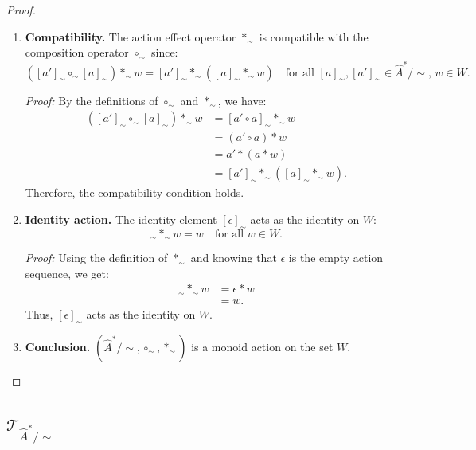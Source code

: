 \begin{proof}
\begin{enumerate}[(1)]
    \item \textbf{Compatibility.}
    The action effect operator $\ast_{\sim}$ is compatible with the composition operator $\circ_{\sim}$ since:
    \begin{equation}
        ([a']_{\sim} \circ_{\sim} [a]_{\sim}) \ast_{\sim} w = [a']_{\sim} \ast_{\sim} ([a]_{\sim} \ast_{\sim} w) \quad \text{for all } [a]_{\sim}, [a']_{\sim} \in \hat{A}^{\ast}/\sim, \, w \in W.
    \end{equation}
    
    \textit{Proof:} By the definitions of $\circ_{\sim}$ and $\ast_{\sim}$, we have:
    \begin{align}
        ([a']_{\sim} \circ_{\sim} [a]_{\sim}) \ast_{\sim} w &= [a' \circ a]_{\sim} \ast_{\sim} w \\
        &= (a' \circ a) \ast w \\
        &= a' \ast (a \ast w) \\
        &= [a']_{\sim} \ast_{\sim} ([a]_{\sim} \ast_{\sim} w).
    \end{align}
    Therefore, the compatibility condition holds.

    \item \textbf{Identity action.}
    The identity element $[\epsilon]_{\sim}$ acts as the identity on $W$:
    \begin{equation}
        [\epsilon]_{\sim} \ast_{\sim} w = w \quad \text{for all } w \in W.
    \end{equation}
    
    \textit{Proof:} Using the definition of $\ast_{\sim}$ and knowing that $\epsilon$ is the empty action sequence, we get:
    \begin{align}
        [\epsilon]_{\sim} \ast_{\sim} w &= \epsilon \ast w \\
        &= w.
    \end{align}
    Thus, $[\epsilon]_{\sim}$ acts as the identity on $W$.

    \item \textbf{Conclusion.}
    $(\hat{A}^{\ast}/\sim, \circ_{\sim}, \ast_{\sim})$ is a monoid action on the set $W$.
\end{enumerate}
\end{proof}


\subsection{$\mathcal{T}_{\hat{A}^{\ast}/\sim}$}

